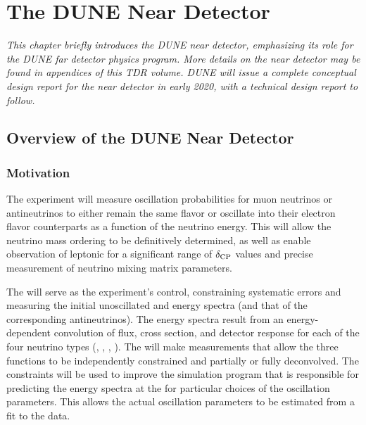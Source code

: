 \chapter{The DUNE Near Detector} %
\label{ch:exsum-nd}

\textit{This chapter briefly introduces the DUNE near detector, emphasizing its role for the DUNE far detector physics program.  More details on the near detector may be found in  appendices of this TDR volume.  DUNE will issue a complete conceptual design report for the near detector in early 2020, with a technical design report to follow.}

\section{Overview of the DUNE Near Detector}
\label{sec:exsum-nd-overview}


\subsection{Motivation}
\label{sec:exsum-nd-BriefOverview-need}


The  experiment will measure oscillation probabilities for muon neutrinos or antineutrinos to either remain the same flavor or oscillate into their electron flavor counterparts as a function of the neutrino energy. This will allow the neutrino mass ordering to be definitively determined, as well as enable observation of leptonic  for a significant range of $\delta_{\rm{CP}}$ values and precise measurement of %
neutrino mixing matrix parameters.

The  will serve as the experiment's control,
 constraining systematic errors and measuring the initial unoscillated \numu and \nue energy spectra (and that of the corresponding antineutrinos). 
 The energy spectra result from an energy-dependent convolution of flux, cross section, and detector response for each of the four %
 neutrino types (\nue, \numu, \anue, \anumu). 
  The  will make measurements that allow the three functions to be independently constrained and partially or fully deconvolved. The constraints will be used to improve the simulation program that is responsible for predicting the energy spectra at the  for particular choices of the oscillation parameters. This allows the actual oscillation parameters to be estimated from a fit to the  data. 
 

